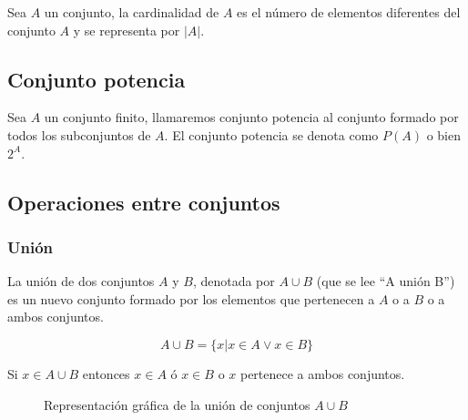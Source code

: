 Sea $A$ un conjunto, la cardinalidad de $A$ es el número de elementos diferentes
del conjunto $A$ y se representa por $|A|$.

\subsection{Conjunto potencia}
Sea $A$ un conjunto finito, llamaremos conjunto potencia al conjunto formado por
todos los subconjuntos de $A$. El conjunto potencia se denota como $P(A)$ o bien
$2^A$.

\subsection{Operaciones entre conjuntos}

\def\firstcircle{(0,0) circle (1.5cm)}
\def\secondcircle{(0:2cm) circle (1.5cm)}
\def\rectangle{(-2,-2) rectangle (4,2)}



\setlength{\parskip}{5mm}

\subsubsection{Unión}

La unión de dos conjuntos $A$ y $B$, denotada por $ A \cup B $ (que se lee “A
unión B”) es un nuevo conjunto formado por los elementos que pertenecen a $A$ o
a $B$ o a ambos conjuntos.

\begin{equation}
    A \cup B = \{x | x \in A \vee x \in B\}
\end{equation}

Si $x \in A \cup B $ entonces $x \in A $ ó $x \in B$ o $x$ pertenece a ambos
conjuntos.

\begin{figure}[h]
    \centering
    \caption{Representación gráfica de la unión de conjuntos $A \cup B$}
    \label{fig:unionConjuntos}
\end{figure}

